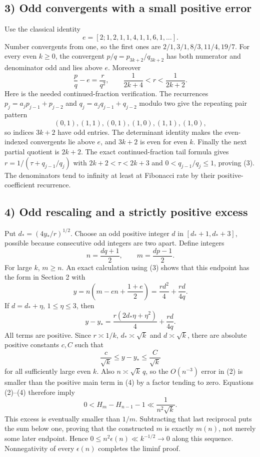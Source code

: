 \subsection*{3) Odd convergents with a small positive error}
Use the classical identity
\[
 e=[2;1,2,1,1,4,1,1,6,1,\ldots].
\]
Number convergents from one, so the first ones are $2/1,3/1,8/3,11/4,19/7$. For every even $k\ge0$, the convergent $p/q=p_{3k+2}/q_{3k+2}$ has both numerator and denominator odd and lies above $e$. Moreover
\[
 \frac pq-e=\frac r{q^2},\qquad
 \frac1{2k+4}<r<\frac1{2k+2}.\tag{3}
\]
Here is the needed continued-fraction verification. The recurrences $p_j=a_jp_{j-1}+p_{j-2}$ and $q_j=a_jq_{j-1}+q_{j-2}$ modulo two give the repeating pair pattern
\[
 (0,1),(1,1),(0,1),(1,0),(1,1),(1,0),
\]
so indices $3k+2$ have odd entries. The determinant identity makes the even-indexed convergents lie above $e$, and $3k+2$ is even for even $k$. Finally the next partial quotient is $2k+2$. The exact continued-fraction tail formula gives $r=1/(\tau+q_{j-1}/q_j)$ with $2k+2<\tau<2k+3$ and $0<q_{j-1}/q_j\le1$, proving (3). The denominators tend to infinity at least at Fibonacci rate by their positive-coefficient recurrence.

\subsection*{4) Odd rescaling and a strictly positive excess}
Put $d_*=(4y_*/r)^{1/2}$. Choose an odd positive integer $d$ in $[d_*+1,d_*+3]$, possible because consecutive odd integers are two apart. Define integers
\[
 n=\frac{dq+1}{2},\qquad m=\frac{dp-1}{2}.
\]
For large $k$, $m\ge n$. An exact calculation using (3) shows that this endpoint has the form in Section 2 with
\[
 y=n\left(m-en+\frac{1+e}{2}\right)
 =\frac{rd^2}{4}+\frac{rd}{4q}.
\]
If $d=d_*+\eta$, $1\le\eta\le3$, then
\[
 y-y_* =\frac{r(2d_*\eta+\eta^2)}4+\frac{rd}{4q}.
\]
All terms are positive. Since $r\asymp1/k$, $d_*\asymp\sqrt k$ and $d\asymp\sqrt k$, there are absolute positive constants $c,C$ such that
\[
 \frac c{\sqrt k}\le y-y_*\le\frac C{\sqrt k}\tag{4}
\]
for all sufficiently large even $k$. Also $n\asymp\sqrt k\,q$, so the $O(n^{-3})$ error in (2) is smaller than the positive main term in (4) by a factor tending to zero. Equations (2)--(4) therefore imply
\[
 0<H_m-H_{n-1}-1\ll\frac1{n^2\sqrt k}.
\]
This excess is eventually smaller than $1/m$. Subtracting that last reciprocal puts the sum below one, proving that the constructed $m$ is exactly $m(n)$, not merely some later endpoint. Hence $0\le n^2\epsilon(n)\ll k^{-1/2}\to0$ along this sequence. Nonnegativity of every $\epsilon(n)$ completes the liminf proof.

